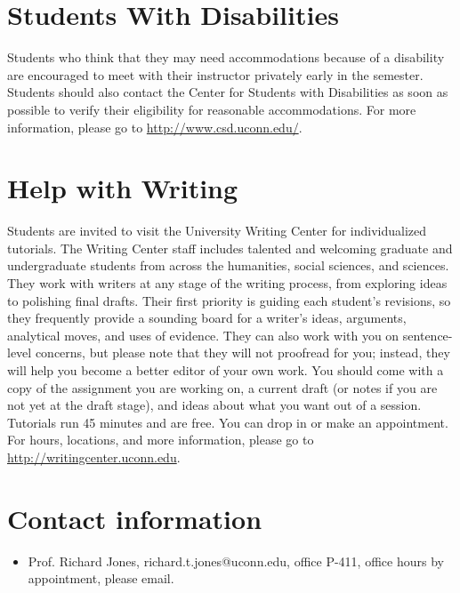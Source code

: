\documentclass{revtex4}
\begin{document}
\section{Students With Disabilities}
Students who think that they may need accommodations because of a disability
are encouraged to meet with their instructor privately early in the semester.
Students should also contact the Center for Students with Disabilities as
soon as possible to verify their eligibility for reasonable accommodations.
For more information, please go to \url{http://www.csd.uconn.edu/}.

\section{Help with Writing}
Students are invited to visit the University Writing Center for individualized
tutorials. The Writing Center staff includes talented and welcoming graduate
and undergraduate students from across the humanities, social sciences, and
sciences. They work with writers at any stage of the writing process, from
exploring ideas to polishing final drafts. Their first priority is guiding 
each student's revisions, so they frequently provide a sounding board for a
writer's ideas, arguments, analytical moves, and uses of evidence. They can
also work with you on sentence-level concerns, but please note that they will
not proofread for you; instead, they will help you become a better editor of
your own work. You should come with a copy of the assignment you are working 
on, a current draft (or notes if you are not yet at the draft stage), and
ideas about what you want out of a session. Tutorials run 45 minutes and are
free. You can drop in or make an appointment. For hours, locations, and more
information, please go to \url{http://writingcenter.uconn.edu}.

\section{Contact information}
\begin{itemize}
\item
Prof. Richard Jones, richard.t.jones@uconn.edu, office P-411, office hours
by appointment, please email.
\end{itemize}
\end{document}

